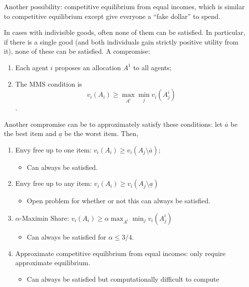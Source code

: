 \documentclass[dvipsnames]{article}
\theoremstyle{definition}
\theoremstyle{remark}
\newenvironment{mech}[1]{\begin{tcolorbox}[colback=red!5!white,colframe=red!75!black,title={#1}]}{\end{tcolorbox}}
\begin{document}
Another possibility: competitive equilibrium from equal incomes, which is similar to competitive equilibrium except give everyone a ``fake dollar'' to spend.

In cases with indivisible goods, often none of them can be satisfied. In particular, if there is a single good (and both individuals gain strictly positive utility from it), none of these can be satisfied. A compromise:

\begin{mech}{Maximin Share (MMS)}
	\begin{enumerate}
		\item Each agent $i$ proposes an allocation $A^1$ to all agents;
		\item The MMS condition is
		$$v_i(A_i) \geq \max_{A^i} \min_j v_i(A_j^i)$$.
	\end{enumerate}
\end{mech}

Another compromise can be to approximately satisfy these conditions: let $\overline{a}$ be the best item and $\underline{a}$ be the worst item. Then,
\begin{enumerate}
	\item Envy free up to one item: $v_i(A_i) \geq v_i(A_j \setminus \overline{a})$;
	\begin{itemize}
		\item Can always be satisfied.
	\end{itemize}
	\item Envy free up to any item: $v_i(A_i) \geq v_i(A_j \setminus \underline{a})$
	\begin{itemize}
		\item Open problem for whether or not this can always be satisfied.
	\end{itemize}
	\item $\alpha$-Maximin Share: $v_i(A_i) \geq \alpha \max_{A^i} \min_j v_i(A_j^i)$
	\begin{itemize}
		\item Can always be satisfied for $\alpha \leq 3/4$.
	\end{itemize}
	\item Approximate competitive equilibrium from equal incomes: only require approximate equilibrium.
	\begin{itemize}
		\item Can always be satisfied but computationally difficult to compute
	\end{itemize}
\end{enumerate}
\end{document}
